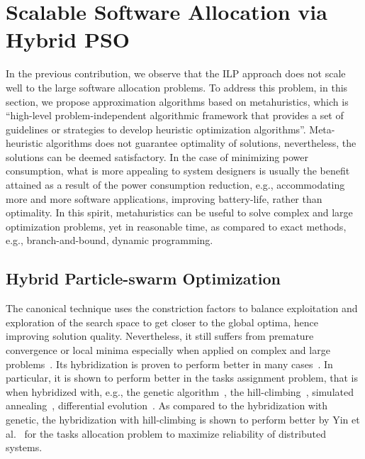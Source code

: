 \section{Scalable Software Allocation via Hybrid PSO}\label{rc_pso}
In the previous contribution, we observe that the ILP approach does not scale well to the large software allocation problems. To address this problem, in this section, we propose approximation algorithms based on metahuristics, which is ``high-level problem-independent algorithmic framework that provides a set of guidelines or strategies to develop heuristic optimization algorithms''. Meta-heuristic algorithms does not guarantee optimality of solutions, nevertheless, the solutions can be deemed satisfactory. In the case of minimizing power consumption, what is more appealing to system designers is usually the benefit attained as a result of the power consumption reduction, e.g., accommodating more and more software applications, improving battery-life, rather than optimality. In this spirit, metahuristics can be useful to solve complex and large optimization problems, yet in reasonable time, as compared to exact methods, e.g., branch-and-bound, dynamic programming.

\subsection{Hybrid Particle-swarm Optimization}
The canonical \pso{} technique uses the constriction factors to balance exploitation and exploration of the search space to get closer to the global optima, hence improving solution quality. Nevertheless, it still suffers from premature convergence or local minima especially when applied on complex and large problems~\cite{Rini2011ParticleChallenges}. Its hybridization is proven to perform better in many cases~\cite{Sengupta2018ParticlePerspectives}. In particular, it is shown to perform better in the tasks assignment problem, that is when hybridized with, e.g., the genetic algorithm~\cite{Sailer2013OptimizingAUTOSAR}, the hill-climbing~\cite{yin2007task}, simulated annealing~\cite{Zhao2007ASystem}, differential evolution~\cite{Storn1997DifferentialSpaces}. As compared to the hybridization with genetic, the hybridization with hill-climbing \hcpso{} is shown to perform better by Yin et al.~\cite{yin2007task} for the tasks allocation problem to maximize reliability of distributed systems. 

